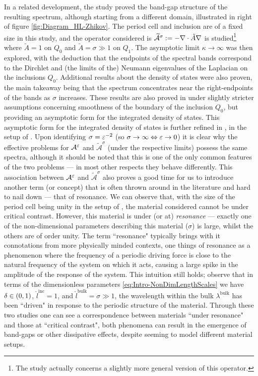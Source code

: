 In a related development, the study \cite{hempel2000spectral} proved the band-gap structure of the resulting spectrum, although starting from a different domain, illustrated in right of figure \ref{fig:Diagram_HL-Zhikov}.
The period cell and inclusion are of a fixed size in this study, and the operator considered is $\widetilde{\mathcal{A}}^\sigma:=-\nabla\cdot\tilde{A}\nabla$ is studied\footnote{The study \cite{hempel2000spectral} actually concerns a slightly more general version of this operator.} where $\widetilde{A}=1$ on $Q_0$ and $\widetilde{A}=\sigma\gg 1$ on $Q_1$.
The asymptotic limit $\kappa\rightarrow\infty$ was then explored, with the deduction that the endpoints of the spectral bands correspond to the Dirchlet and (the limits of the) Neumann eigenvalues of the Laplacian on the inclusions $Q_0$.
Additional results about the density of states were also proven, the main takeaway being that the spectrum concentrates near the right-endpoints of the bands as $\sigma$ increases. 
These results are also proved in \cite{friedlander2002density} under slightly stricter assumptions concerning smoothness of the boundary of the inclusion $Q_0$, but providing an asymptotic form for the integrated density of states. 
This asymptotic form for the integrated density of states is further refined in \cite{selden2005periodic}, in the setup of \cite{friedlander2002density}. 
Upon identifying $\sigma=\varepsilon^{-2}$ (so $\sigma\rightarrow\infty \Leftrightarrow \varepsilon\rightarrow0$) it is clear why the effective problems for $\mathcal{A}^{\varepsilon}$ and $\widetilde{\mathcal{A}}^{\sigma}$ (under the respective limits) possess the same spectra, although it should be noted that this is one of the only common features of the two problems --- in most other respects they behave differently.
This association between $\mathcal{A}^{\varepsilon}$ and $\widetilde{\mathcal{A}}^{\sigma}$ also proves a good time for us to introduce another term (or concept) that is often thrown around in the literature and hard to nail down --- that of resonance.
We can observe that, with the size of the period cell being unity in the setup of \cite{hempel2000spectral}, the material considered cannot be under critical contrast.
However, this material is under (or at) \emph{resonance} --- exactly one of the non-dimensional parameters describing this material ($\sigma$) is large, whilst the others are of order unity.
The term ``resonance" typically brings with it connotations from more physically minded contexts, one things of resonance as a phenomenon where the frequency of a periodic driving force is close to the natural frequency of the system on which it acts, causing a large spike in the amplitude of the response of the system.
This intuition still holds; observe that in terms of the dimensionless parameters \eqref{eq:Intro-NonDimLengthScales} we have $\delta\in\left( 0,1 \right)$, $\hat{l}^{\mathrm{inc}}=1$, and $\hat{l}^{\mathrm{bulk}}=\sigma\gg 1$, the wavelength within the bulk $\lambda^{\mathrm{bulk}}$ has been ``driven" in response to the periodic structure of the material.
Through these two studies one can see a correspondence between materials ``under resonance" and those at ``critical contrast", both phenomena can result in the emergence of band-gaps or other dissipative effects, despite seeming to model different material setups.

